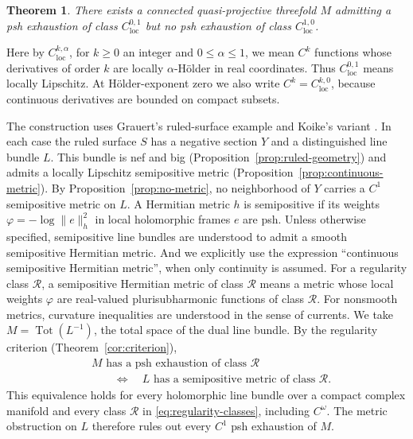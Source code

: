 \documentclass[11pt]{amsart}
\newtheorem{theorem}{Theorem}[section]
\theoremstyle{definition}
\theoremstyle{remark}
\numberwithin{equation}{section}
\newcommand{\Tot}{\operatorname{Tot}}
\begin{document}
\begin{theorem}\label{thm:main}
There exists a connected quasi-projective threefold
$M$ admitting a psh exhaustion of class $C^{0,1}_{\mathrm{loc}}$
but no psh exhaustion of class $C^{1,0}_{\mathrm{loc}}$.
\end{theorem}

Here by $C^{k,\alpha}_{\mathrm{loc}}$, for $k\ge0$ an integer and
$0\le\alpha\le1$, we mean $C^k$ functions whose derivatives of order $k$
are locally $\alpha$-H\"older in real coordinates. Thus
$C^{0,1}_{\mathrm{loc}}$ means locally Lipschitz. At H\"older-exponent zero we also write $C^k=C^{k,0}_{\mathrm{loc}}$, because continuous derivatives are bounded on compact subsets.

The construction uses Grauert's ruled-surface example
\cite[\S4, 8(d)]{Grauert1962} and Koike's variant
\cite[Example~4.1]{Koike2021}. In each case the ruled surface $S$ has a
negative section $Y$ and a distinguished line bundle $L$. This bundle
is nef and big (Proposition~\ref{prop:ruled-geometry}) and admits a
locally Lipschitz semipositive metric (Proposition~\ref{prop:continuous-metric}).
By Proposition~\ref{prop:no-metric}, no neighborhood of $Y$ carries
a $C^1$ semipositive metric on $L$. A Hermitian metric $h$ is
semipositive if its weights
$\varphi=-\log\|e\|_h^2$ in local holomorphic frames $e$ are psh. Unless otherwise specified, semipositive line bundles are understood to admit a smooth semipositive Hermitian metric. And we explicitly use the expression ``continuous semipositive Hermitian metric'', when only continuity is assumed. For a regularity class $\mathcal R$, a semipositive Hermitian metric of class $\mathcal R$ means a metric whose local weights $\varphi$ are real-valued plurisubharmonic functions of class $\mathcal R$. For nonsmooth metrics, curvature inequalities are understood in the sense of currents.
We take $M=\Tot(L^{-1})$, the total space of the dual line bundle. By the regularity criterion
(Theorem~\ref{cor:criterion}),
\[
\begin{aligned}
&M\text{ has a psh exhaustion of class }\mathcal R
\\&\qquad\Longleftrightarrow\quad
L\text{ has a semipositive metric of class }\mathcal R.
\end{aligned}
\]
This equivalence holds for every holomorphic line bundle over
a compact complex manifold and every class $\mathcal R$ in
\eqref{eq:regularity-classes}, including $C^\omega$.
The metric obstruction on $L$ therefore rules out every
$C^1$ psh exhaustion of $M$.
\end{document}
